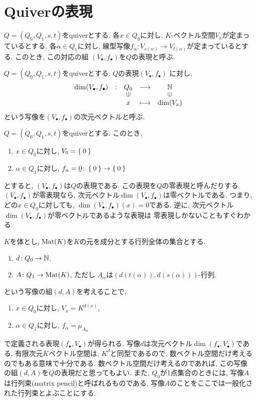 \section{Quiverの表現}
\begin{definition}
  $Q=(Q_0,Q_1,s,t)$をquiverとする.
  各$x\in Q_0$に対し, $K$-ベクトル空間$V_x$が定まっているとする.
  各$\alpha\in Q_1$に対し, 線型写像$f_\alpha\colon V_{s(\alpha)}\to V_{t(\alpha)}$が定まっているとする.
  このとき, この対応の組 $(V_\bullet, f_\bullet)$を$Q$の表現と呼ぶ.
\end{definition}
\begin{definition}
  $Q=(Q_0,Q_1,s,t)$をquiverとする.
  $Q$の表現$(V_\bullet, f_\bullet)$
  に対し,
  \begin{align*}
    \shazo{\dim(V_\bullet, f_\bullet)}
          {Q_0}{\NN}
          {x}{\dim(V_x)}
  \end{align*}
  という写像を$(V_\bullet,f_\bullet)$の次元ベクトルと呼ぶ.
\end{definition}
\begin{example}
  $Q=(Q_0,Q_1,s,t)$をquiverとする.
  このとき,
  \begin{enumerate}
  \item $x\in Q_0$に対し, $V_0=\Set{0}$
  \item $\alpha\in Q_1$に対し, $f_\alpha=\underline{0}\colon \Set{0}\to \Set{0}$
  \end{enumerate}
  とすると, $(V_\bullet,f_\bullet)$は$Q$の表現である.
  この表現を$Q$の零表現と呼んだりする.
  $(V_\bullet,f_\bullet)$が零表現なら,
  次元ベクトル$\dim(V_\bullet,f_\bullet)$は零ベクトルである.
  つまり, どの$x\in Q_0$に対しても,
  $\dim(V_\bullet,f_\bullet)(x)=0$である.
  逆に,
  次元ベクトル$\dim(V_\bullet,f_\bullet)$が零ベクトルであるような表現は
  零表現しかないこともすぐわかる.
\end{example}
\begin{remark}
  $K$を体とし, $\operatorname{Mat}(K)$を$K$の元を成分とする行列全体の集合とする.
  \begin{enumerate}
  \item $d\colon Q_0\to \mathbb{N}$.
  \item $A\colon Q_1 \to \operatorname{Mat}(K)$, ただし $A_{\alpha}$は$(d(t(\alpha)),d(s(\alpha)))$-行列.
  \end{enumerate}
  という写像の組$(d,A)$を考えることで,
  \begin{enumerate}
  \item $x\in Q_0$に対し, $V_x=K^{d(x)}$,
  \item $\alpha\in Q_1$に対し, $f_\alpha=\mu_{A_\alpha}$
  \end{enumerate}
  で定義される表現$(f_\bullet,V_\bullet)$が得られる.
  写像$d$は次元ベクトル$\dim(f_\bullet,V_\bullet)$である.
  有限次元$K$ベクトル空間は, $K^d$と同型であるので,
  数ベクトル空間だけ考えるのでもある意味で十分である.
  数ベクトル空間だけ考えるのであれば,
  この写像の組$(d,A)$を$Q$の表現だと思ってもよい.
  また, $Q_0$が1点集合のときには,
  写像$A$は行列束(matrix pencil)と呼ばれるものである.
  写像$A$のことをここでは一般化された行列束とよぶことにする.
\end{remark}


